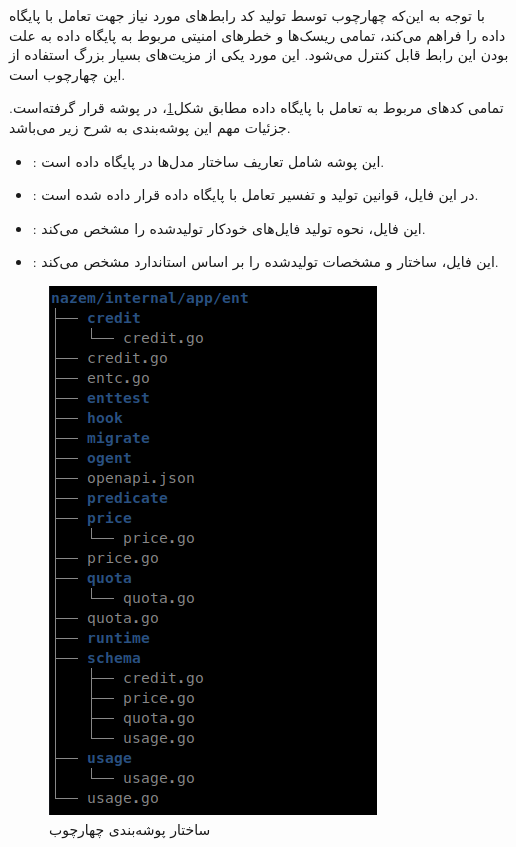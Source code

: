 با توجه به این‌که چهارچوب  توسط تولید کد رابط‌های مورد نیاز جهت تعامل با پایگاه داده را فراهم می‌کند، تمامی ریسک‌ها و خطر‌های امنیتی مربوط به پایگاه داده به علت  بودن این رابط قابل کنترل می‌شود. این مورد یکی از مزیت‌های بسیار بزرگ استفاده از این چهارچوب است.

تمامی کد‌های مربوط به تعامل با پایگاه داده مطابق شکل\ref{fig:ent}، در پوشه  قرار گرفته‌است. جزئیات مهم این پوشه‌بندی به شرح زیر می‌باشد.

\begin{itemize}
	\item {}: این پوشه شامل تعاریف ساختار مدل‌ها در پایگاه داده است.
	\item {}: در این فایل، قوانین تولید و تفسیر  تعامل با پایگاه داده قرار داده شده است.
	\item {}: این فایل، نحوه تولید فایل‌های خودکار تولید‌شده را مشخص می‌کند.
	\item {}: این فایل، ساختار و مشخصات  تولید‌شده را بر اساس استاندارد  مشخص می‌کند.
\end{itemize}

\begin{figure}
	\vspace{1cm}
	\centering
	\includegraphics[scale=0.45]{figures/ent.png}
	\caption{ساختار پوشه‌بندی چهارچوب }
	\label{fig:ent}
\end{figure}

